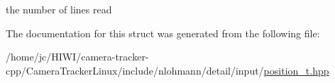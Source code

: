 the number of lines read 



The documentation for this struct was generated from the following file\+:\begin{DoxyCompactItemize}
\item 
/home/jc/\+H\+I\+W\+I/camera-\/tracker-\/cpp/\+Camera\+Tracker\+Linux/include/nlohmann/detail/input/\hyperlink{position__t_8hpp}{position\+\_\+t.\+hpp}\end{DoxyCompactItemize}

